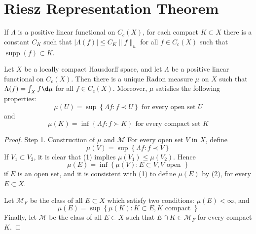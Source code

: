 \documentclass[12pt, a4paper, oneside]{book}
\begin{document}
\section{Riesz Representation Theorem}
\begin{lemma}
    If $\Lambda$ is a positive linear functional on $C_c(X)$, for each compact $K \subset X$ there is a constant $C_K$ such that $|\Lambda(f)| \leq C_K\|f\|_u$ for all $f \in C_c(X)$ such that $\operatorname{supp}(f) \subset K$.
\end{lemma}
\begin{theorem}
    Let $X$ be a locally compact Hausdorff space, and let $\Lambda$ be a positive linear functional on $C_c(X)$.
    Then there is a unique Radon measure $\mu$ on $X$ such that $\Lambda(f)=\int_X f \d \mu$ for all $f \in C_c(X)$.
    Moreover, $\mu$ satisfies the following properties:
    \begin{equation*}
        \mu(U)=\sup \left\{\Lambda f: f \prec U\right\} \text { for every open set } U
    \end{equation*}
    and
    \begin{equation*}
        \mu(K)=\inf \left\{\Lambda f: f \succ K\right\} \text { for every compact set } K
    \end{equation*}
    \begin{proof}
        Step 1. Construction of $\mu$ and $\mathcal{M}$
        For every open set $V$ in $X$, define
        \begin{equation*}
            \mu(V)=\sup \left\{\Lambda f : f\prec V\right\}
            \tag{1}
        \end{equation*}
        If $V_1 \subset V_2$, it is clear that (1) implies $\mu\left(V_1\right) \leq \mu\left(V_2\right)$. Hence
        \begin{equation*}
            \mu(E)=\inf \left\{\mu(V): E \subset V, V \text { open }\right\}
            \tag{2}
        \end{equation*}
        if $E$ is an open set, and it is consistent with (1) to define $\mu(E)$ by (2), for every $E \subset X$.

        Let $\mathcal{M}_F$ be the class of all $E \subset X$ which satisfy two conditions: $\mu(E)<\infty$, and
        \begin{equation*}
            \mu(E)=\sup \left\{\mu(K): K \subset E, K \text { compact }\right\}
            \tag{3}
        \end{equation*}
        Finally, let $\mathcal{M}$ be the class of all $E \subset X$ such that $E \cap K \in \mathcal{M}_F$ for every compact $K$.



\end{proof}
\end{theorem}
\end{document}
